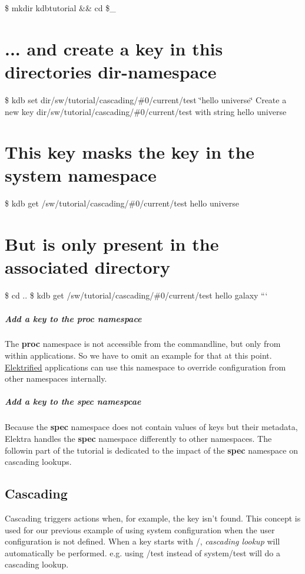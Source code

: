 \$ mkdir kdbtutorial \&\& cd \$\+\_\+

\section*{... and create a key in this directories dir-\/namespace}

\$ kdb set dir/sw/tutorial/cascading/\#0/current/test \char`\"{}hello universe\char`\"{} Create a new key dir/sw/tutorial/cascading/\#0/current/test with string hello universe

\section*{This key masks the key in the system namespace}

\$ kdb get /sw/tutorial/cascading/\#0/current/test hello universe

\section*{But is only present in the associated directory}

\$ cd .. \$ kdb get /sw/tutorial/cascading/\#0/current/test hello galaxy ```

\subparagraph*{Add a key to the proc namespace}

The {\bfseries proc} namespace is not accessible from the commandline, but only from within applications. So we have to omit an example for that at this point. \hyperlink{md_doc_help_elektra-glossary_doc_help_elektra-glossary_md}{Elektrified} applications can use this namespace to override configuration from other namespaces internally.

\subparagraph*{Add a key to the spec namespcae}

Because the {\bfseries spec} namespace does not contain values of keys but their metadata, Elektra handles the {\bfseries spec} namespace differently to other namespaces. The followin part of the tutorial is dedicated to the impact of the {\bfseries spec} namespace on cascading lookups.

\subsection*{Cascading}

Cascading triggers actions when, for example, the key isn't found. This concept is used for our previous example of using {\ttfamily system} configuration when the {\ttfamily user} configuration is not defined. When a key starts with {\ttfamily /}, {\itshape cascading lookup} will automatically be performed. e.\+g. using {\ttfamily /test} instead of {\ttfamily system/test} will do a cascading lookup.

